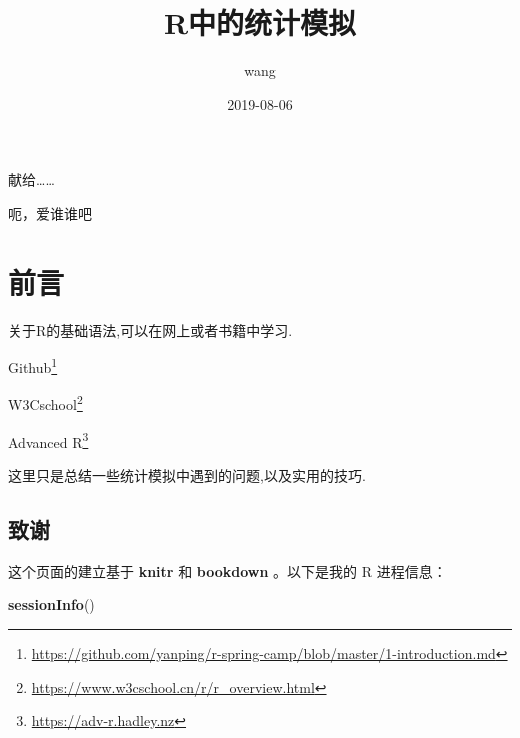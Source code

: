 \documentclass[]{ctexbook}
\title{R中的统计模拟}
\author{wang}
\date{2019-08-06}
\newenvironment{Shaded}{\begin{snugshade}}{\end{snugshade}}
\newcommand{\KeywordTok}[1]{\textcolor[rgb]{0.13,0.29,0.53}{\textbf{#1}}}
\newcommand{\NormalTok}[1]{#1}
\renewcommand{\href}[2]{#2\footnote{\url{#1}}}
\begin{document}
\maketitle


\thispagestyle{empty}

\begin{center}
献给……

呃，爱谁谁吧
\end{center}

\setlength{\abovedisplayskip}{-5pt}
\setlength{\abovedisplayshortskip}{-5pt}

{
\setcounter{tocdepth}{2}
\tableofcontents
}
\listoftables
\listoffigures
\hypertarget{section}{%
\chapter*{前言}\label{section}}


关于R的基础语法,可以在网上或者书籍中学习.

\href{https://github.com/yanping/r-spring-camp/blob/master/1-introduction.md}{Github}

\href{https://www.w3cschool.cn/r/r_overview.html}{W3Cschool}

\href{https://adv-r.hadley.nz}{Advanced R}

这里只是总结一些统计模拟中遇到的问题,以及实用的技巧.

\hypertarget{section-1}{%
\section*{致谢}\label{section-1}}


这个页面的建立基于 \textbf{knitr} \citep{xie2015}和 \textbf{bookdown} \citep{R-bookdown}。以下是我的 R 进程信息：

\begin{Shaded}
\begin{Highlighting}[]
\KeywordTok{sessionInfo}\NormalTok{()}
\end{Highlighting}
\end{Shaded}
\end{document}
